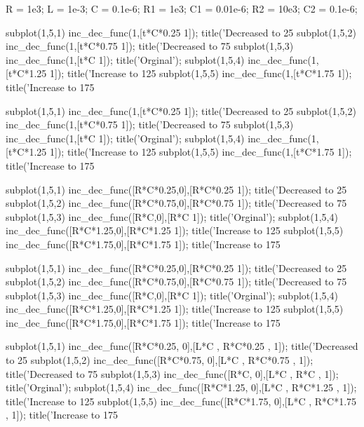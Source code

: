R = 1e3;     L = 1e-3;   C = 0.1e-6;     R1 = 1e3;
C1 = 0.01e-6;    R2 = 10e3;     C2 = 0.1e-6;



subplot(1,5,1)
inc_dec_func(1,[t*C*0.25 1]);
title('Decreased to 25%
subplot(1,5,2)
inc_dec_func(1,[t*C*0.75 1]);
title('Decreased to 75%
subplot(1,5,3)
inc_dec_func(1,[t*C 1]);
title('Orginal');
subplot(1,5,4)
inc_dec_func(1,[t*C*1.25 1]);
title('Increase to 125%
subplot(1,5,5)
inc_dec_func(1,[t*C*1.75 1]);
title('Increase to 175%



subplot(1,5,1)
inc_dec_func(1,[t*C*0.25 1]);
title('Decreased to 25%
subplot(1,5,2)
inc_dec_func(1,[t*C*0.75 1]);
title('Decreased to 75%
subplot(1,5,3)
inc_dec_func(1,[t*C 1]);
title('Orginal');
subplot(1,5,4)
inc_dec_func(1,[t*C*1.25 1]);
title('Increase to 125%
subplot(1,5,5)
inc_dec_func(1,[t*C*1.75 1]);
title('Increase to 175%



subplot(1,5,1)
inc_dec_func([R*C*0.25,0],[R*C*0.25 1]);
title('Decreased to 25%
subplot(1,5,2)
inc_dec_func([R*C*0.75,0],[R*C*0.75 1]);
title('Decreased to 75%
subplot(1,5,3)
inc_dec_func([R*C,0],[R*C 1]);
title('Orginal');
subplot(1,5,4)
inc_dec_func([R*C*1.25,0],[R*C*1.25 1]);
title('Increase to 125%
subplot(1,5,5)
inc_dec_func([R*C*1.75,0],[R*C*1.75 1]);
title('Increase to 175%



subplot(1,5,1)
inc_dec_func([R*C*0.25,0],[R*C*0.25 1]);
title('Decreased to 25%
subplot(1,5,2)
inc_dec_func([R*C*0.75,0],[R*C*0.75 1]);
title('Decreased to 75%
subplot(1,5,3)
inc_dec_func([R*C,0],[R*C 1]);
title('Orginal');
subplot(1,5,4)
inc_dec_func([R*C*1.25,0],[R*C*1.25 1]);
title('Increase to 125%
subplot(1,5,5)
inc_dec_func([R*C*1.75,0],[R*C*1.75 1]);
title('Increase to 175%



subplot(1,5,1)
inc_dec_func([R*C*0.25, 0],[L*C , R*C*0.25 , 1]);
title('Decreased to 25%
subplot(1,5,2)
inc_dec_func([R*C*0.75, 0],[L*C , R*C*0.75 , 1]);
title('Decreased to 75%
subplot(1,5,3)
inc_dec_func([R*C, 0],[L*C , R*C , 1]);
title('Orginal');
subplot(1,5,4)
inc_dec_func([R*C*1.25, 0],[L*C , R*C*1.25 , 1]);
title('Increase to 125%
subplot(1,5,5)
inc_dec_func([R*C*1.75, 0],[L*C , R*C*1.75 , 1]);
title('Increase to 175%



